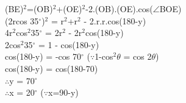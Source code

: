 \documentclass[journal,12pt,twocolumn]{IEEEtran}
\renewcommand\thesection{\arabic{section}}
\begin{document}
\begin{enumerate}[label=\thesection.\arabic*.,ref=\thesection.\theenumi]
               (BE)$^{2}$=(OB)$^{2}$+(OE)$^{2}$-2.(OB).(OE).cos($\angle$BOE)\\ 
                (2rcos 35$^{\circ}$)$^{2}$ = r$^{2}$+r$^{2}$ - 2.r.r.cos(180-y)\\ 
                4r$^{2}$cos$^{2}$35$^{\circ}$ = 2r$^{2}$ - 2r$^{2}$cos(180-y)\\ 
                2cos$^{2}$35$^{\circ}$ = 1 - cos(180-y)\\ 
                cos(180-y) = -cos 70$^{\circ}$       (${\because}$1-cos$^{2}$${\theta}$ = cos 2${\theta}$)\\ 
                cos(180-y) = cos(180-70)\\ 
                ${\therefore}$y = 70$^{\circ}$\\ 
               ${\therefore}$x = 20$^{\circ}$             (${\because}$x=90-y)\\  
               
               
\end{enumerate}
\end{document}

